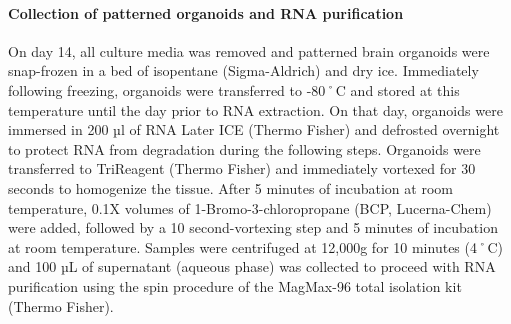 \paragraph{Collection of patterned organoids and RNA purification}
On day 14, all culture media was removed and patterned brain organoids were snap-frozen in a bed of isopentane (Sigma-Aldrich) and dry ice. Immediately following freezing, organoids were transferred to -80˚C and stored at this temperature until the day prior to RNA extraction. On that day, organoids were immersed in 200 µl of RNA Later ICE (Thermo Fisher) and defrosted overnight to protect RNA from degradation during the following steps. Organoids were transferred to TriReagent  (Thermo Fisher) and immediately vortexed for 30 seconds to homogenize the tissue. After 5 minutes of incubation at room temperature, 0.1X volumes of 1-Bromo-3-chloropropane (BCP, Lucerna-Chem) were added, followed by a 10 second-vortexing step and 5 minutes of incubation at room temperature. Samples were centrifuged at 12,000g for 10 minutes (4˚C) and 100 µL of supernatant (aqueous phase) was collected to proceed with RNA purification using the spin procedure of the MagMax-96 total isolation kit (Thermo Fisher). 

